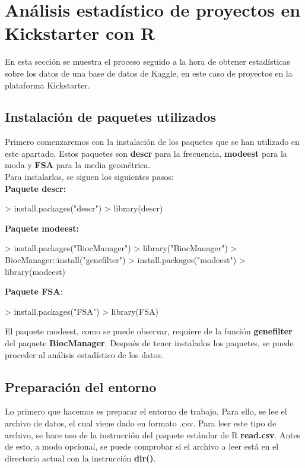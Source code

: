 \documentclass [a4paper] {article}
\begin{document}
\section{Análisis estadístico de proyectos en Kickstarter con R}
En esta sección se muestra el proceso seguido a la hora de obtener estadísticas sobre los 
datos de una base de datos de Kaggle, en este caso de proyectos en la plataforma Kickstarter.\\

\subsection{Instalación de paquetes utilizados}
Primero comenzaremos con la instalación de los paquetes que se han utilizado en este apartado. 
Estos paquetes son \textbf{descr} para la frecuencia, \textbf{modeest} para la moda y \textbf{FSA}
para la media geométrica.\\
Para instalarlos, se siguen los siguientes pasos:\\ 
\textbf{Paquete descr:}
\begin{Schunk}
\begin{Sinput}
> install.packages("descr")
> library(descr)
\end{Sinput}
\end{Schunk}
\textbf{Paquete modeest:}

\begin{Schunk}
\begin{Sinput}
> install.packages("BiocManager")
> library("BiocManager")
> BiocManager::install("genefilter")
> install.packages("modeest")
> library(modeest)
\end{Sinput}
\end{Schunk}
\textbf{Paquete FSA}:

\begin{Schunk}
\begin{Sinput}
> install.packages("FSA")
> library(FSA)
\end{Sinput}
\end{Schunk}
El paquete modeest, como se puede observar, requiere de la función \textbf{genefilter} del paquete
\textbf{BiocManager}. Después de tener instalados los paquetes, se puede proceder al análisis estadístico
de los datos.\\

\subsection{Preparación del entorno}
Lo primero que hacemos es preparar el entorno de trabajo. Para ello, se lee el archivo de datos, el 
cual viene dado en formato .csv. Para leer este tipo de archivo, se hace uso de la instrucción del 
paquete estándar de R \textbf{read.csv}. Antes de esto, a modo opcional, se puede comprobar si el archivo
a leer está en el directorio actual con la instrucción \textbf{dir()}.
\end{document}
